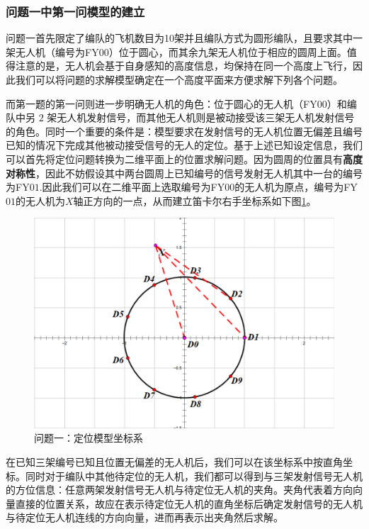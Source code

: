 \documentclass[withoutpreface,bwprint]{cumcmthesis} %
\begin{document}
		\subsubsection{问题一中第一问模型的建立}
		\par 问题一首先限定了编队的飞机数目为10架并且编队方式为圆形编队，且要求其中一架无人机（编号为FY$ 00 $）位于圆心，而其余九架无人机位于相应的圆周上面。值得注意的是，无人机会基于自身感知的高度信息，均保持在同一个高度上飞行，因此我们可以将问题的求解模型确定在一个高度平面来方便求解下列各个问题。
		\par 
		而第一题的第一问则进一步明确无人机的角色：位于圆心的无人机（FY$ 00 $）和编队中另 $ 2 $ 架无人机发射信号，而其他无人机则是被动接受该三架无人机发射信号的角色。同时一个重要的条件是：模型要求在发射信号的无人机位置无偏差且编号已知的情况下完成其他被动接受信号的无人的定位。基于上述已知设定信息，我们可以首先将定位问题转换为二维平面上的位置求解问题。因为圆周的位置具有\textbf{高度对称性}，因此不妨假设其中两台圆周上已知编号的信号发射无人机其中一台的编号为FY$ 01 $.因此我们可以在二维平面上选取编号为FY$ 00 $的无人机为原点，编号为FY$ 01 $的无人机为$ X $轴正方向的一点，从而建立笛卡尔右手坐标系如下图\ref{1-1}。
		\begin{figure}[htb]
			\centering
			\includegraphics[width=0.7\linewidth]{./figures/Question1-1.png}
			\caption{问题一：定位模型坐标系}
			\label{1-1}
		\end{figure}
		在已知三架编号已知且位置无偏差的无人机后，我们可以在该坐标系中按直角坐标。同时对于编队中其他待定位的无人机，我们都可以得到与三架发射信号无人机的方位信息：任意两架发射信号无人机与待定位无人机的夹角。夹角代表着方向向量直接的位置关系，故应在表示待定位无人机的直角坐标后确定发射信号的无人机与待定位无人机连线的方向向量，进而再表示出夹角然后求解。
\end{document}
